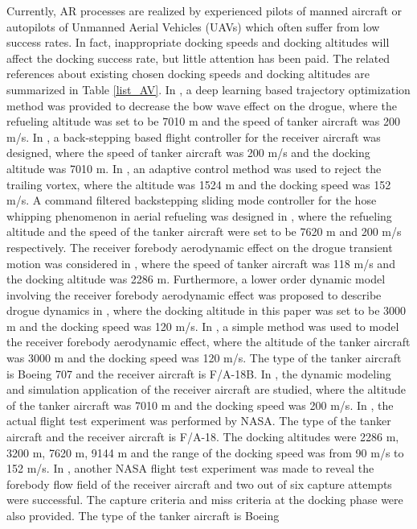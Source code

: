 Currently, AR processes are realized by experienced pilots of manned
aircraft or autopilots of Unmanned Aerial Vehicles (UAVs) which often suffer
from low success rates. In fact, inappropriate docking speeds and docking altitudes will affect the
docking success rate, but little attention has been paid. The related
references about existing chosen docking speeds and docking altitudes are
summarized in Table \ref{list_AV}. In \cite{3}, a deep learning based
trajectory optimization method was provided to decrease the bow wave effect on the drogue,
where the refueling altitude was set to be 7010 m and the speed of tanker aircraft was 200 m/s.
In \cite{4}, a back-stepping based flight controller for the receiver aircraft was designed,
where the speed of tanker aircraft was 200 m/s and the docking altitude was 7010 m.
In \cite{5}, an adaptive control method was used to reject the trailing
vortex, where the altitude was 1524 m and the docking speed was 152 m/s.
A command filtered backstepping sliding mode controller for the
hose whipping phenomenon in aerial refueling was designed in \cite{6}, where the refueling altitude and the speed of the tanker aircraft were set to be 7620 m and 200 m/s respectively.
The receiver forebody aerodynamic effect on the drogue transient motion was
considered in \cite{7}, where the speed of tanker aircraft was 118 m/s and
the docking altitude was 2286 m.
Furthermore, a lower order dynamic model involving the receiver forebody
aerodynamic effect was proposed to describe drogue dynamics in \cite{8},
where the docking altitude in this paper was set to be 3000 m and the
docking speed was 120 m/s.
In \cite{9}, a simple method was used to model
the receiver forebody aerodynamic effect, where the altitude of the tanker
aircraft was 3000 m and the docking speed was 120 m/s. The type of the
tanker aircraft is Boeing 707 and the receiver aircraft is F/A-18B.
In \cite{10}, the dynamic modeling and simulation application of the receiver
aircraft are studied, where the altitude of the tanker aircraft was 7010
m and the docking speed was 200 m/s.
In \cite{11}, the actual flight test
experiment was performed by NASA. The type of the tanker aircraft and the
receiver aircraft is F/A-18. The docking altitudes were 2286 m, 3200 m, 7620
m, 9144 m and the range of the docking speed was from 90 m/s to 152 m/s.
In \cite{12}, another NASA flight test experiment was made to reveal the forebody flow field of the receiver aircraft and two out of six capture attempts were successful. The capture criteria and miss criteria at the
docking phase were also provided. The type of the tanker aircraft is Boeing
